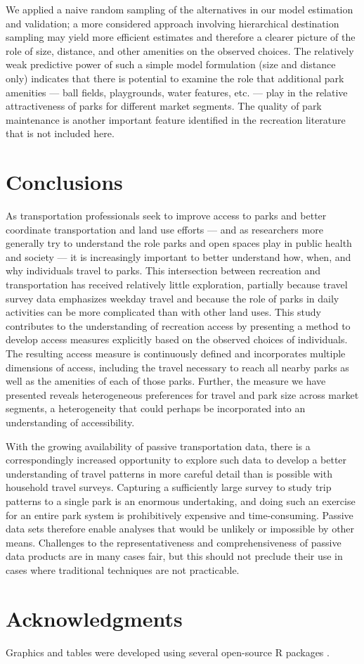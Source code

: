 \documentclass[3p, authoryear]{elsarticle} %
\begin{document}
We applied a naive random sampling of the alternatives in our model estimation
and validation; a more considered approach involving hierarchical destination
sampling may yield more efficient estimates and therefore a clearer picture of
the role of size, distance, and other amenities on the observed choices. The
relatively weak predictive power of such a simple model formulation (size and
distance only) indicates that there is potential to examine the role that
additional park amenities --- ball fields, playgrounds, water features, etc. ---
play in the relative attractiveness of parks for different market segments. The
quality of park maintenance is another important feature identified in the
recreation literature \citep{Fletcher2003} that is not included here.

\hypertarget{conclusions}{%
\section{Conclusions}\label{conclusions}}

As transportation professionals seek to improve access to parks and better
coordinate transportation and land use efforts --- and as researchers more
generally try to understand the role parks and open spaces play in public health
and society --- it is increasingly important to better understand how, when, and
why individuals travel to parks. This intersection between recreation and
transportation has received relatively little exploration, partially because
travel survey data emphasizes weekday travel and because the role of parks in
daily activities can be more complicated than with other land uses. This study
contributes to the understanding of recreation access by presenting a method to
develop access measures explicitly based on the observed choices of individuals.
The resulting access measure is continuously defined and incorporates multiple
dimensions of access, including the travel necessary to reach all nearby parks
as well as the amenities of each of those parks. Further, the measure we have
presented reveals heterogeneous preferences for travel and park size across
market segments, a heterogeneity that could perhaps be incorporated into an
understanding of accessibility.

With the growing availability of passive transportation data, there is a
correspondingly increased opportunity to explore such data to develop a better
understanding of travel patterns in more careful detail than is possible with
household travel surveys. Capturing a sufficiently large survey to study trip
patterns to a single park is an enormous undertaking, and doing such an exercise
for an entire park system is prohibitively expensive and time-consuming. Passive
data sets therefore enable analyses that would be unlikely or impossible by
other means. Challenges to the representativeness and comprehensiveness of
passive data products are in many cases fair, but this should not preclude their
use in cases where traditional techniques are not practicable.

\hypertarget{acknowledgments}{%
\section*{Acknowledgments}\label{acknowledgments}}

Graphics and tables were developed using several open-source R packages
\citep{ggmap, modelsummary, wesanderson}.


\end{document}
